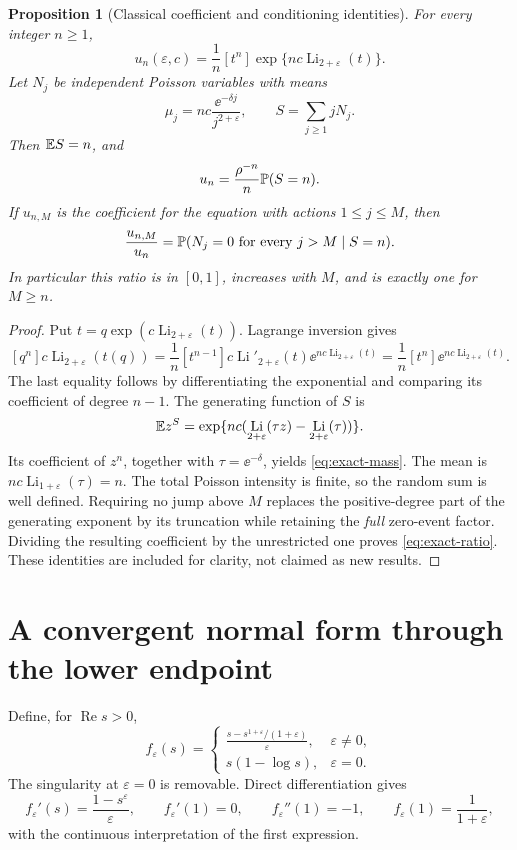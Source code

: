 \documentclass[11pt,a4paper]{article}
\numberwithin{equation}{section}
\newtheorem{proposition}[theorem]{Proposition}
\theoremstyle{definition}
\theoremstyle{remark}
\DeclareMathOperator{\Li}{Li}
\DeclareMathOperator{\Rea}{Re}
\newcommand{\ep}{\varepsilon}\newcommand{\la}{\lambda}
\newcommand{\coef}[1]{[#1]}
\begin{document}
\begin{proposition}[Classical coefficient and conditioning identities]
\label{prop:poisson}
For every integer \(n\ge1\),
\begin{equation}\label{eq:lagrange}
 u_n(\ep,c)=\frac1n\coef{t^n}\exp\{nc\Li_{2+\ep}(t)\}.
\end{equation}
Let \(N_j\) be independent Poisson variables with means
\begin{equation}\label{eq:intensities}
 \mu_j=nc\frac{\ee^{-\delta j}}{j^{2+\ep}},\qquad
 S=\sum_{j\ge1}jN_j.
\end{equation}
Then \(\mathbb E S=n\), and
\begin{equation}\label{eq:exact-mass}
 u_n=\frac{\rho^{-n}}n\mathbb P(S=n).
\end{equation}
If \(u_{n,M}\) is the coefficient for the equation with actions
\(1\le j\le M\), then
\begin{equation}\label{eq:exact-ratio}
 \frac{u_{n,M}}{u_n}
 =\mathbb P(N_j=0\text{ for every }j>M\mid S=n).
\end{equation}
In particular this ratio is in \([0,1]\), increases with \(M\), and is
exactly one for \(M\ge n\).
\end{proposition}
\begin{proof}
Put \(t=q\exp(c\Li_{2+\ep}(t))\). Lagrange inversion gives
\[
 \coef{q^n}c\Li_{2+\ep}(t(q))
 =\frac1n\coef{t^{n-1}}c\Li'_{2+\ep}(t)
                         \ee^{nc\Li_{2+\ep}(t)}
 =\frac1n\coef{t^n}\ee^{nc\Li_{2+\ep}(t)}.
\]
The last equality follows by differentiating the exponential and
comparing its coefficient of degree \(n-1\).
The generating function of \(S\) is
\[
 \E z^S=\exp\{nc(\Li_{2+\ep}(\tau z)-\Li_{2+\ep}(\tau))\}.
\]
Its coefficient of \(z^n\), together with \(\tau=\ee^{-\delta}\), yields
\eqref{eq:exact-mass}. The mean is
\(nc\Li_{1+\ep}(\tau)=n\). The total Poisson intensity is finite, so the
random sum is well defined. Requiring no jump above \(M\) replaces the
positive-degree part of the generating exponent by its truncation while
retaining the \emph{full} zero-event factor. Dividing the resulting
coefficient by the unrestricted one proves \eqref{eq:exact-ratio}.
These identities are included for clarity, not claimed as new results.
\end{proof}

\section{A convergent normal form through the lower endpoint}
\label{sec:normal}
Define, for \(\Rea s>0\),
\begin{equation}\label{eq:f}
 f_\ep(s)=
 \begin{cases}
 \displaystyle\frac{s-s^{1+\ep}/(1+\ep)}\ep,&\ep\ne0,\\[5pt]
 s(1-\log s),&\ep=0.
 \end{cases}
\end{equation}
The singularity at \(\ep=0\) is removable. Direct differentiation gives
\begin{equation}\label{eq:f-derivatives}
 f_\ep'(s)=\frac{1-s^\ep}{\ep},\qquad
 f_\ep'(1)=0,\qquad f_\ep''(1)=-1,\qquad
 f_\ep(1)=\frac1{1+\ep},
\end{equation}
with the continuous interpretation of the first expression.
\end{document}
